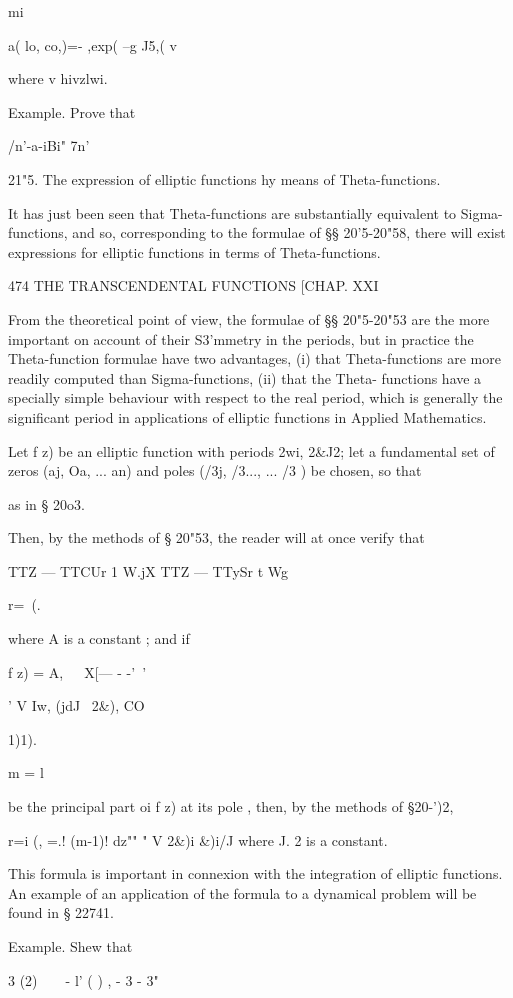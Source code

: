mi

a( lo, co,)=- ,exp( --g J5,( v

where v hivzlwi.

Example. Prove that

/n'-a-iBi" 7n'\

21"5. The expression of elliptic functions hy means of
Theta-functions.

It has just been seen that Theta-functions are substantially
equivalent to Sigma-functions, and so, corresponding to the formulae
of §§ 20'5-20"58, there will exist expressions for elliptic functions
in terms of Theta-functions.

474 THE TRANSCENDENTAL FUNCTIONS [CHAP. XXI

From the theoretical point of view, the formulae of §§ 20"5-20"53 are
the more important on account of their S3'mmetry in the periods, but
in practice the Theta-function formulae have two advantages, (i) that
Theta-functions are more readily computed than Sigma-functions, (ii)
that the Theta- functions have a specially simple behaviour with
respect to the real period, which is generally the significant period
in applications of elliptic functions in Applied Mathematics.

Let f z) be an elliptic function with periods 2wi, 2\&J2; let a
fundamental set of zeros (aj, Oa, ... an) and poles (/3j, /3..., ...
/3 ) be chosen, so that

as in § 20o3.

Then, by the methods of § 20"53, the reader will at once verify that

TTZ — TTCUr 1 W.jX TTZ — TTySr t Wg

r=\ (.

where A is a constant ; and if

f z) = A,\ \ \ X[— - -'~' \ \ %

' V Iw, (jdJ \ 2\&), CO

1)1).

m = l

be the principal part oi f z) at its pole , then, by the methods of
§20-')2,

r=i (, =.! (m-1)! dz"" " V 2\&)i \&)i/J where J. 2 is a constant.

This formula is important in connexion with the integration of
elliptic functions. An example of an application of the formula to a
dynamical problem will be found in § 22741.

Example. Shew that

  3 (2)\ \ \ \ - l' ( ) , - 3 - 3"

